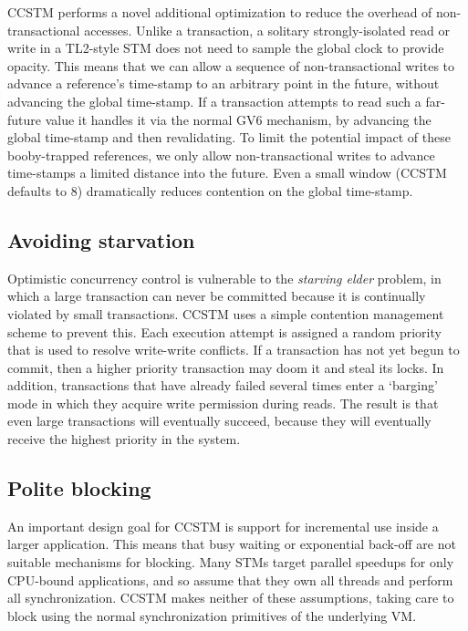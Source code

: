 CCSTM performs a novel additional optimization to reduce the overhead
of non-transactional accesses.  Unlike a transaction, a solitary
strongly-isolated read or write in a TL2-style STM does not need to
sample the global clock to provide opacity.  This means that we can allow
a sequence of non-transactional writes to advance a reference's time-stamp to
an arbitrary point in the future, without advancing the global time-stamp.
If a transaction attempts to read such a far-future value it handles
it via the normal GV6 mechanism, by advancing the global time-stamp and
then revalidating.  To limit the potential impact of these booby-trapped
references, we only allow non-transactional writes to advance time-stamps
a limited distance into the future.  Even a small window (CCSTM defaults
to 8) dramatically reduces contention on the global time-stamp.

\subsection{Avoiding starvation}

Optimistic concurrency control is vulnerable to the \textit{starving
elder} problem, in which a large transaction can never be committed because
it is continually violated by small transactions.  CCSTM uses a simple
contention management scheme to prevent this.  Each execution attempt is
assigned a random priority that is used to resolve write-write conflicts.
If a transaction has not yet begun to commit, then a higher priority
transaction may doom it and steal its locks.  In addition, transactions
that have already failed several times enter a `barging' mode in which
they acquire write permission during reads.  The result is that even
large transactions will eventually succeed, because they will eventually
receive the highest priority in the system.

\subsection{Polite blocking}

An important design goal for CCSTM is support for incremental use inside a
larger application.  This means that busy waiting or exponential back-off
are not suitable mechanisms for blocking.  Many STMs target parallel
speedups for only CPU-bound applications, and so assume that they own all
threads and perform all synchronization.  CCSTM makes neither of these
assumptions, taking care to block using the normal synchronization
primitives of the underlying VM.

